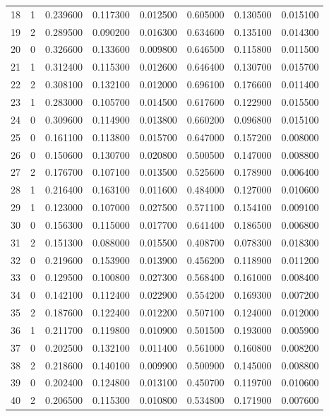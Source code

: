 \begin{table}
\begin{tabular}{l|r|ccc|ccc}
18 & 1 & 0.239600 & 0.117300 & 0.012500 & 0.605000 & 0.130500 & 0.015100 \\
19 & 2 & 0.289500 & 0.090200 & 0.016300 & 0.634600 & 0.135100 & 0.014300 \\
20 & 0 & 0.326600 & 0.133600 & 0.009800 & 0.646500 & 0.115800 & 0.011500 \\
21 & 1 & 0.312400 & 0.115300 & 0.012600 & 0.646400 & 0.130700 & 0.015700 \\
22 & 2 & 0.308100 & 0.132100 & 0.012000 & 0.696100 & 0.176600 & 0.011400 \\
23 & 1 & 0.283000 & 0.105700 & 0.014500 & 0.617600 & 0.122900 & 0.015500 \\
24 & 0 & 0.309600 & 0.114900 & 0.013800 & 0.660200 & 0.096800 & 0.015100 \\
25 & 0 & 0.161100 & 0.113800 & 0.015700 & 0.647000 & 0.157200 & 0.008000 \\
26 & 0 & 0.150600 & 0.130700 & 0.020800 & 0.500500 & 0.147000 & 0.008800 \\
27 & 2 & 0.176700 & 0.107100 & 0.013500 & 0.525600 & 0.178900 & 0.006400 \\
28 & 1 & 0.216400 & 0.163100 & 0.011600 & 0.484000 & 0.127000 & 0.010600 \\
29 & 1 & 0.123000 & 0.107000 & 0.027500 & 0.571100 & 0.154100 & 0.009100 \\
30 & 0 & 0.156300 & 0.115000 & 0.017700 & 0.641400 & 0.186500 & 0.006800 \\
31 & 2 & 0.151300 & 0.088000 & 0.015500 & 0.408700 & 0.078300 & 0.018300 \\
32 & 0 & 0.219600 & 0.153900 & 0.013900 & 0.456200 & 0.118900 & 0.011200 \\
33 & 0 & 0.129500 & 0.100800 & 0.027300 & 0.568400 & 0.161000 & 0.008400 \\
34 & 0 & 0.142100 & 0.112400 & 0.022900 & 0.554200 & 0.169300 & 0.007200 \\
35 & 2 & 0.187600 & 0.122400 & 0.012200 & 0.507100 & 0.124000 & 0.012000 \\
36 & 1 & 0.211700 & 0.119800 & 0.010900 & 0.501500 & 0.193000 & 0.005900 \\
37 & 0 & 0.202500 & 0.132100 & 0.011400 & 0.561000 & 0.160800 & 0.008200 \\
38 & 2 & 0.218600 & 0.140100 & 0.009900 & 0.500900 & 0.145000 & 0.008800 \\
39 & 0 & 0.202400 & 0.124800 & 0.013100 & 0.450700 & 0.119700 & 0.010600 \\
40 & 2 & 0.206500 & 0.115300 & 0.010800 & 0.534800 & 0.171900 & 0.007600 \\

\end{tabular}
\end{table}
